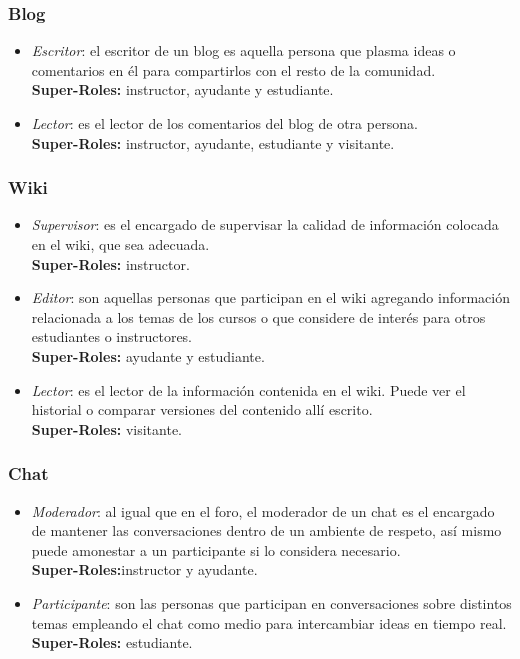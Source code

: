 \subsubsection{Blog}
\begin{itemize}
	\item \emph{Escritor}: el escritor de un blog es aquella persona que plasma ideas o comentarios en él para compartirlos con el resto de la comunidad.\\
		\textbf{Super-Roles:} instructor, ayudante y estudiante.
	\item \emph{Lector}: es el lector de los comentarios del blog de otra persona.\\
		\textbf{Super-Roles:} instructor, ayudante, estudiante y visitante.
\end{itemize}

\subsubsection{Wiki}
\begin{itemize}
	\item \emph{Supervisor}: es el encargado de supervisar la calidad de información colocada en el wiki, que sea adecuada.\\
		\textbf{Super-Roles:} instructor.
	\item \emph{Editor}: son aquellas personas que participan en el wiki agregando información relacionada a los temas de los cursos o que considere de interés para otros estudiantes o instructores.\\
		\textbf{Super-Roles:} ayudante y estudiante.
	\item \emph{Lector}: es el lector de la información contenida en el wiki. Puede ver el historial o comparar versiones del contenido allí escrito.\\
		\textbf{Super-Roles:} visitante.
\end{itemize}

\subsubsection{Chat}
\begin{itemize}
	\item \emph{Moderador}: al igual que en el foro, el moderador de un chat es el encargado de mantener las conversaciones dentro de un ambiente de respeto, así mismo puede amonestar a un participante si lo considera necesario.\\
		\textbf{Super-Roles:}instructor y ayudante.	
	\item \emph{Participante}: son las personas que participan en conversaciones sobre distintos temas empleando el chat como medio para intercambiar ideas en tiempo real.\\
		\textbf{Super-Roles:} estudiante.
\end{itemize}

